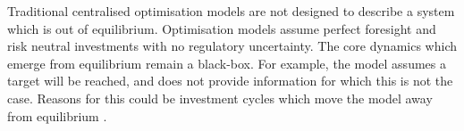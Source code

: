 
Traditional centralised optimisation models are not designed to  describe a system which is out of equilibrium. Optimisation models assume perfect foresight and risk neutral investments with no regulatory uncertainty. The core dynamics which emerge from equilibrium remain a black-box. For example, the model assumes a target will be reached, and does not provide information for which this is not the case. Reasons for this could be investment cycles which move the model away from equilibrium \cite{Chappin2017}.









